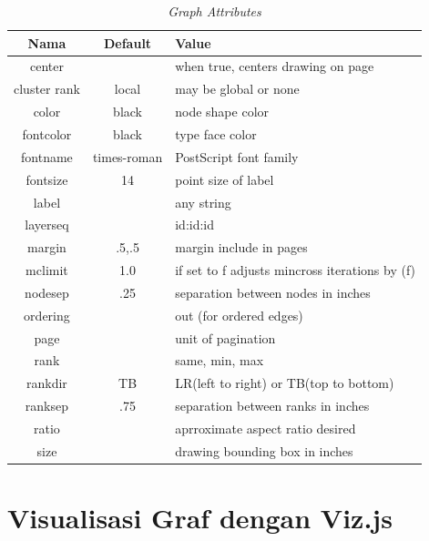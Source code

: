 \begin{enumerate}
\begin{enumerate}
\begin{table}[H]
\begin{center}
\caption{\textit{Graph Attributes}}
\begin{tabular}{|c|c|l|}
\hline
  Nama & Default & Value \\
\hline
  center & & when true, centers drawing on page \\
  cluster rank & local & may be global or none \\
  color & black & node shape color \\
  fontcolor & black & type face color \\
  fontname & times-roman & PostScript font family \\
  fontsize & 14 & point size of label \\
  label & & any string \\
  layerseq & & id:id:id \\
  margin & .5,.5 & margin include in pages \\
  mclimit & 1.0 & if set to f adjusts mincross iterations by (f) \\
  nodesep & .25 & separation between nodes in inches \\
  ordering & & out (for ordered edges) \\
  page & & unit of pagination  \\
  rank & & same, min, max \\
  rankdir & TB & LR(left to right) or TB(top to bottom) \\
  ranksep & .75 & separation between ranks in inches \\
  ratio & & aprroximate aspect ratio desired \\
  size & & drawing bounding box in inches \\
\hline
\end{tabular}
\end{center}
\end{table}

\end{enumerate}
\end{enumerate}



\section{Visualisasi Graf dengan Viz.js}
\label{sec: Visualisasi Graf dengan Viz.js}

